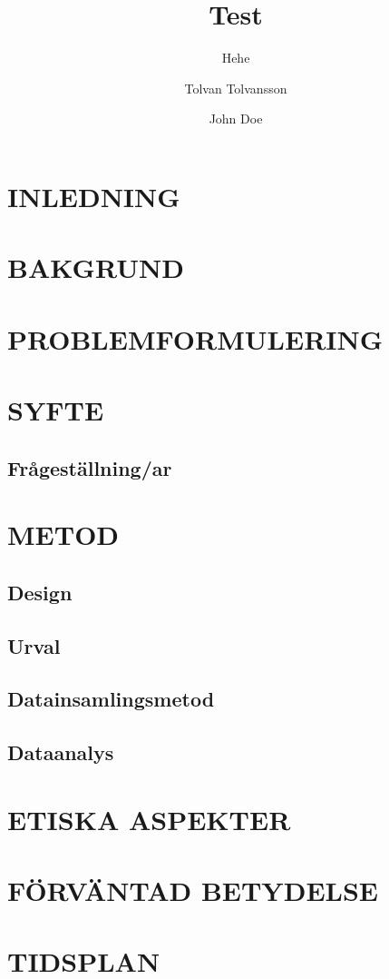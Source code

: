\documentclass[
    a4paper,
    12pt,
    halfparskip,
]{rkhpm}
\title{Test}
\subtitle{Hehe}
\author{Tolvan Tolvansson \and John Doe}
\begin{document}
 

\maketitle
\thispagestyle{empty}
\setcounter{page}{0}

\section*{INLEDNING}

\section*{BAKGRUND}

\section*{PROBLEMFORMULERING}

\section*{SYFTE}

\subsection*{Frågeställning/ar}

\section*{METOD}

\subsection*{Design}

\subsection*{Urval}

\subsection*{Datainsamlingsmetod}

\subsection*{Dataanalys}

\section*{ETISKA ASPEKTER}

\section*{FÖRVÄNTAD BETYDELSE}

%

\section*{TIDSPLAN}
\end{document}

